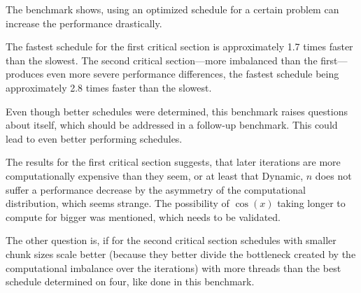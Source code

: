 \documentclass[twoside,11pt]{article}
\begin{document}
The benchmark shows, using an optimized schedule for
a certain problem can increase the performance drastically.

The fastest schedule for the first critical section is
approximately 1.7 times faster than the slowest.
The second critical section---more imbalanced than the
first---produces even more severe performance differences,
the fastest schedule being approximately 2.8 times faster
than the slowest.

Even though better schedules were determined, this
benchmark raises questions about itself, which should be
addressed in a follow-up benchmark.
This could lead to even better performing schedules.

The results for the first critical section suggests, that
later iterations are more computationally expensive than
they seem, or at least that Dynamic, $n$ does not suffer
a performance decrease by the asymmetry of the
computational distribution, which seems strange.
The possibility of $\cos(x)$ taking longer to compute for
bigger was mentioned, which needs to be validated.

The other question is, if for the second critical section
schedules with smaller chunk sizes scale better (because
they better divide the bottleneck created by the
computational imbalance over the iterations) with more
threads than the best schedule determined on four, like
done in this benchmark.



\end{document}
